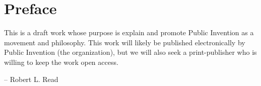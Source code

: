 \documentclass[
	fontsize=10pt, %
	twoside=false, %
	secnumdepth=1, %
]{kaobook}
\begin{document}

\maketitle


\chapter*{Preface}

This is a draft work whose purpose is explain and promote Public Invention as a
movement and philosophy.
This work will likely be published electronically by Public Invention (the organization),
but we will also seek a print-publisher who is willing to keep the work open access.

-- Robert L. Read


\begingroup %

\setlength{\textheight}{230\vscale} %

\etocstandarddisplaystyle %
\etocstandardlines %

\tableofcontents %

\listoffigures %

\let\cleardoublepage\bigskip
\let\clearpage\bigskip
\end{document}
